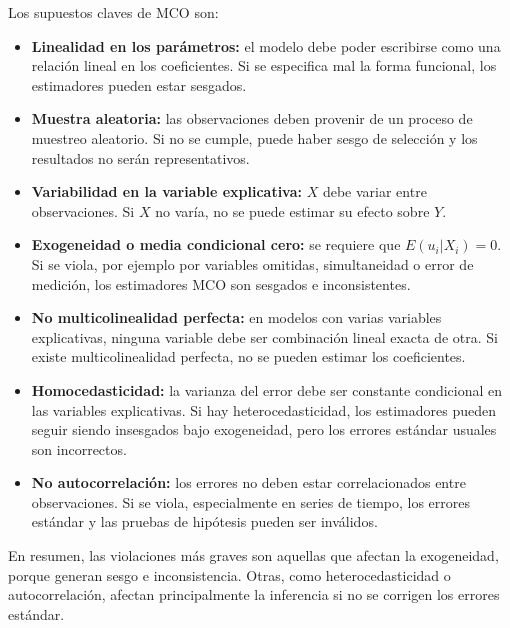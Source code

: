\documentclass[letterpaper,11pt]{article}
\begin{document}
\begin{enumerate}
Los supuestos claves de MCO son:
\begin{itemize}
    \item \textbf{Linealidad en los parámetros:} el modelo debe poder escribirse como una relación lineal en los coeficientes. Si se especifica mal la forma funcional, los estimadores pueden estar sesgados.
    \item \textbf{Muestra aleatoria:} las observaciones deben provenir de un proceso de muestreo aleatorio. Si no se cumple, puede haber sesgo de selección y los resultados no serán representativos.
    \item \textbf{Variabilidad en la variable explicativa:} $X$ debe variar entre observaciones. Si $X$ no varía, no se puede estimar su efecto sobre $Y$.
    \item \textbf{Exogeneidad o media condicional cero:} se requiere que $E(u_i|X_i)=0$. Si se viola, por ejemplo por variables omitidas, simultaneidad o error de medición, los estimadores MCO son sesgados e inconsistentes.
    \item \textbf{No multicolinealidad perfecta:} en modelos con varias variables explicativas, ninguna variable debe ser combinación lineal exacta de otra. Si existe multicolinealidad perfecta, no se pueden estimar los coeficientes.
    \item \textbf{Homocedasticidad:} la varianza del error debe ser constante condicional en las variables explicativas. Si hay heterocedasticidad, los estimadores pueden seguir siendo insesgados bajo exogeneidad, pero los errores estándar usuales son incorrectos.
    \item \textbf{No autocorrelación:} los errores no deben estar correlacionados entre observaciones. Si se viola, especialmente en series de tiempo, los errores estándar y las pruebas de hipótesis pueden ser inválidos.
\end{itemize}
En resumen, las violaciones más graves son aquellas que afectan la exogeneidad, porque generan sesgo e inconsistencia. Otras, como heterocedasticidad o autocorrelación, afectan principalmente la inferencia si no se corrigen los errores estándar.


\end{enumerate}
\end{document}
